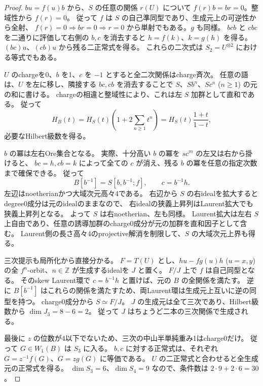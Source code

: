 \begin{proof}
$bu=f(u)b$ から、$S$ の任意の関係 $r(U)$ について
$f(r)b=br=0$。整域性から $f(r)=0$。
従って $f$ は $S$ の自己準同型であり、生成元上の可逆性から全射、
$f(r)=0\Rightarrow br=0\Rightarrow r=0$ から単射でもある。$g$ も同様。
$bcb$ と $cbc$ を二通りに評価して右側の $b,c$ を消去すると
$h=f(k)$、$k=g(h)$ を得る。
$(bc)u$、$(cb)u$ から残る二正常式を得る。
これらの二次式は $S_2=U^{\otimes2}$ における等式でもある。

$U$ のchargeを0、$b$ を1、$c$ を $-1$ とすると全二次関係はcharge斉次。
任意の語は、$U$ を左に移し、隣接する $bc,cb$ を消去することで
$S$、$Sb^n$、$Sc^n$ ($n\ge1$) の元の和に書ける。
chargeの相違と整域性により、これは左 $S$ 加群として直和である。
従って
\[
 H_B(t)=H_S(t)\left(1+2\sum_{n\ge1}t^n\right)
       =H_S(t)\frac{1+t}{1-t},
\]
必要なHilbert級数を得る。

$b$ の冪は左右Ore集合となる。
実際、十分高い $b$ の冪を $s c^m$ の左又は右から掛けると、
$bc=h,cb=k$ によって全ての $c$ が消え、残る $b$ の冪を任意の指定次数まで確保できる。
従って
\[
 B[b^{-1}]=S[b,b^{-1};f],\qquad c=b^{-1}h.
\]
左辺はnoetherianかつ大域次元高々4である。
右辺から $S$ の右idealを拡大するとdegree0成分は元のidealのままなので、
右idealの狭義上昇列はLaurent拡大でも狭義上昇列となる。
よって $S$ は右noetherian、左も同様。
Laurent拡大は左右 $S$ 上自由であり、任意の誘導加群のcharge0成分が元の加群を直和因子として含む。
Laurent側の長さ高々4のprojective解消を制限して、$S$ の大域次元上界も得る。

三次提示も局所化から直接分かる。
$F=T(U)$ とし、$h u-fg(u)h$ ($u=x,y$) の全 $f^n$-orbit、$n\in\mathbb Z$ が生成するidealを $J$ と置く。
$F/J$ 上で $f$ は自己同型となる。
そのskew Laurent環で $c=b^{-1}h$ と置けば、元の $B$ の全関係を満たす。
逆に $B[b^{-1}]$ はこれらの関係を満たすため、両Laurent環は生成元上互いに逆の同型を持つ。
charge0成分から $S\simeq F/J$。
$J$ の生成元は全て三次であり、Hilbert級数から $\dim J_3=8-6=2$。
従って $J$ はちょうど二本の三次関係で生成される。

最後に $z$ の位数が4以下でないため、三次の中山半単純重み1はcharge0だけ。
従って $G\in W_1(B)$ は $S_3$ に入る。
$b,c$ に対する正常式は、それぞれ
$G=z^{-1}f(G)$、$G=z g(G)$ に等価である。
$U$ の二正常式と合わせると全生成元の正常式を得る。
$\dim S_3=6$、$\dim S_4=9$ なので、条件数は $2\cdot9+2\cdot6=30$。
\end{proof}

